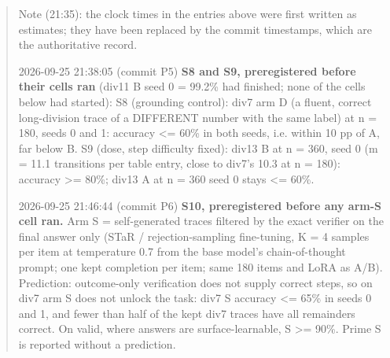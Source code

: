 \documentclass{article}
\theoremstyle{definition}
\begin{document}
\begin{small}
\begin{quote}
Note (21:35): the clock times in the entries above were first written as estimates; they have been replaced by the commit timestamps, which are the authoritative record.

2026-09-25 21:38:05 (commit P5) \textbf{S8 and S9, preregistered before their cells ran} (div11 B seed 0 = 99.2\% had finished; none of the cells below had started): S8 (grounding control): div7 arm D (a fluent, correct long-division trace of a DIFFERENT number with the same label) at n = 180, seeds 0 and 1: accuracy <= 60\% in both seeds, i.e. within 10 pp of A, far below B. S9 (dose, step difficulty fixed): div13 B at n = 360, seed 0 (m = 11.1 transitions per table entry, close to div7's 10.3 at n = 180): accuracy >= 80\%; div13 A at n = 360 seed 0 stays <= 60\%.

2026-09-25 21:46:44 (commit P6) \textbf{S10, preregistered before any arm-S cell ran.} Arm S = self-generated traces filtered by the exact verifier on the final answer only (STaR / rejection-sampling fine-tuning, K = 4 samples per item at temperature 0.7 from the base model's chain-of-thought prompt; one kept completion per item; same 180 items and LoRA as A/B). Prediction: outcome-only verification does not supply correct steps, so on div7 arm S does not unlock the task: div7 S accuracy <= 65\% in seeds 0 and 1, and fewer than half of the kept div7 traces have all remainders correct. On valid, where answers are surface-learnable, S >= 90\%. Prime S is reported without a prediction.
\end{quote}
\end{small}
\end{document}
